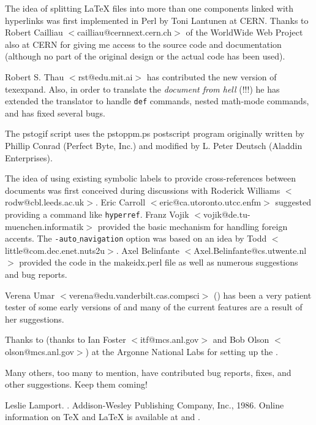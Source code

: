 The idea of splitting LaTeX  files
into more than one components linked with hyperlinks was first
implemented in Perl by Toni Lantunen at CERN.
Thanks to Robert Cailliau $<$cailliau@cernnext.cern.ch$>$
of the WorldWide Web Project also at CERN 
for giving me access to the source code and documentation (although no
part of the original design or the actual code has been used).

Robert S. Thau $<$rst@edu.mit.ai$>$ has contributed the new version of
{\fn texexpand}. Also, in order to translate the {\em document 
from hell} (!!!) he has extended the translator to handle {\tt def}
commands, nested math-mode commands, and has fixed several bugs.

The {\fn pstogif} script 
uses the {\fn pstoppm.ps} postscript program originally written by
Phillip Conrad (Perfect Byte, Inc.) and modified by L. Peter Deutsch 
(Aladdin Enterprises).

The idea of using existing symbolic labels to provide cross-references
between documents was first conceived during discussions with 
Roderick Williams $<$rodw@cbl.leeds.ac.uk$>$.
Eric Carroll $<$eric@ca.utoronto.utcc.enfm$>$ suggested providing
a command like {\tt hyperref}. Franz Vojik
$<$vojik@de.tu-muenchen.informatik$>$
provided the basic mechanism for handling foreign accents.
The {\tt -auto$\_$navigation} option was based on an idea by
Todd $<$little@com.dec.enet.nuts2u$>$.
Axel Belinfante $<$Axel.Belinfante@cs.utwente.nl$>$ provided the
code in the {\fn makeidx.perl} file as well as numerous suggestions
and bug reports. 

Verena Umar $<$verena@edu.vanderbilt.cas.compsci$>$ 
() has been a very
patient tester of some early versions of \latextohtml
and many of the current features are a result of her 
suggestions. 

Thanks to (thanks to Ian Foster 
$<$itf@mcs.anl.gov$>$ and Bob Olson $<$olson@mcs.anl.gov$>$) at the
Argonne National Labs for setting up the
.

Many others, too many to mention, 
have contributed bug reports, fixes, and other suggestions. Keep them coming!



\begin{thebibliography}{1}
Leslie Lamport.
.
\newblock Addison-Wesley Publishing Company, Inc., 1986.
\newblock Online information on TeX and LaTeX is available at
   and
  .
\end{thebibliography}


\begin{theindex}

\end{theindex}


